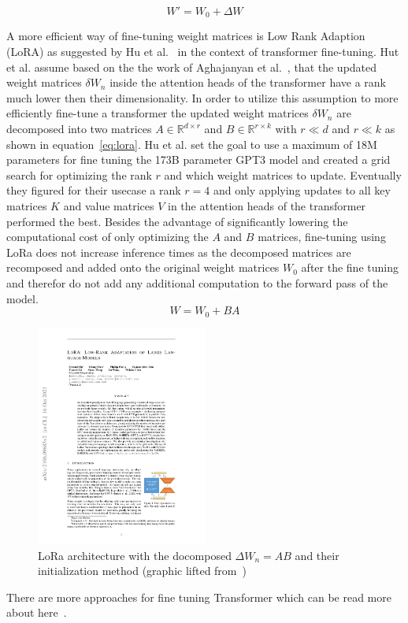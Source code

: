 \begin{equation}
    W' = W_0 + \Delta W
    \label{eq:finetuning}
\end{equation}

A more efficient way of fine-tuning weight matrices is Low Rank Adaption (LoRA) as suggested by Hu et al.~\cite{Hu2021} in the context of transformer fine-tuning.
Hut et al. assume based on the the work of Aghajanyan et al.~\cite{Aghajanyan2020}, that the updated weight matrices $\delta W_n$ inside the attention heads of the transformer have a rank much lower then their dimensionality.
In order to utilize this assumption to more efficiently fine-tune a transformer the updated weight matrices $\delta W_n$ are decomposed into two matrices $A \in \mathbb{R}^{d \times r}$ and $B \in \mathbb{R}^{r \times k}$ with $r \ll d$ and $r \ll k$ as shown in equation~\ref{eq:lora}.
Hu et al. set the goal to use a maximum of 18M parameters for fine tuning the 173B parameter GPT3 model and created a grid search for optimizing the rank $r$ and which weight matrices to update.
Eventually they figured for their usecase a rank $r = 4$ and only applying updates to all key matrices $K$ and value matrices $V$ in the attention heads of the transformer performed the best.
Besides the advantage of significantly lowering the computational cost of only optimizing the $A$ and $B$ matrices, fine-tuning using LoRa does not increase inference times as the decomposed matrices are recomposed and added onto the original weight matrices $W_0$ after the fine tuning and therefor do not add any additional computation to the forward pass of the model.
\begin{equation}
    W = W_0 + BA
    \label{eq:lora}
\end{equation}

\begin{figure}
    \centering
    \includegraphics[width=0.5\textwidth]{images/Hu2021_LoraArch.pdf}
    \caption[LoRa Architecture]{LoRa architecture with the docomposed $\Delta W_n = AB$ and their initialization  method (graphic lifted from~\cite{Hu2021})}\label{fig:loraarch}
\end{figure}

There are more approaches for fine tuning Transformer which can be read more about here~\cite{Xin2024}.